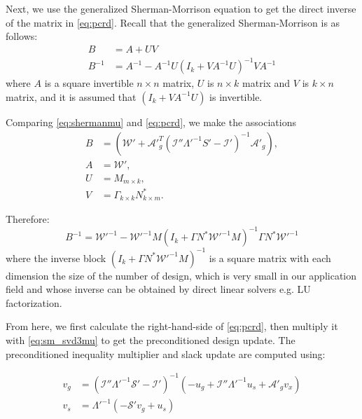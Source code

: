 \documentclass{article}
\theoremstyle{definition}
\begin{document}
Next,  we use the generalized Sherman-Morrison equation to get the direct inverse of the matrix in \eqref{eq:pcrd}. Recall that the generalized Sherman-Morrison is as follows: 
\begin{equation}\label{eq:shermanmu}
\begin{aligned}
B &= A + UV \\
B^{-1} &= A^{-1} - A^{-1}U(I_k + VA^{-1}U)^{-1}VA^{-1} 
\end{aligned}
\end{equation}
where $A$ is a square invertible $n\times n$ matrix,  $U$ is $n \times k$ matrix and  $V$ is $k\times n$ matrix, and it is assumed that $( I_k + VA^{-1}U )$ is invertible. 

Comparing \eqref{eq:shermanmu} and \eqref{eq:pcrd}, we make the associations
\begin{equation}\label{eq:sherman_svd2mu}
\begin{aligned}
B  &=  \left(\mathcal{W}' + \mathcal{A}'^T_g \left( \mathcal{I}'' \Lambda'^{-1} S' - \mathcal{I}'\right)^{-1} \mathcal{A}'_g \right), \\
A  &=  \mathcal{W}', \\
U  &= M_{m\times k},    \\
V  &=  \Gamma_{k\times k}N^{*}_{k\times m}. 
\end{aligned}
\end{equation} 

Therefore:
\begin{equation}\label{eq:sm_svd3mu}
B^{-1} = \mathcal{W}'^{-1} - \mathcal{W}'^{-1} M \left( I_k +\Gamma N^{*}  \mathcal{W}'^{-1} M \right)^{-1} \Gamma N^{*} \mathcal{W}'^{-1}  
\end{equation}
where the inverse block $\left( I_k +\Gamma N^{*}  \mathcal{W}'^{-1} M \right)^{-1}$ is a square matrix with each dimension the size of the number of design, which is very small in our application field and whose inverse can be obtained by direct linear solvers e.g. LU factorization. 

From here, we first calculate the right-hand-side of \eqref{eq:pcrd}, then multiply it with \eqref{eq:sm_svd3mu} to get the preconditioned design update. The preconditioned inequality multiplier and slack update are computed using:

\begin{equation}\label{eq:vgvs}
\begin{aligned}
v_g &= \left( \mathcal{I}'' \Lambda'^{-1} \mathcal{S}' - \mathcal{I}'\right)^{-1} \left(-u_g + \mathcal{I}''\Lambda'^{-1} u_s + \mathcal{A}'_g v_x \right) \\
v_s &=  \Lambda'^{-1} ( -\mathcal{S}'v_g + u_s) 
\end{aligned}
\end{equation}
\end{document}
